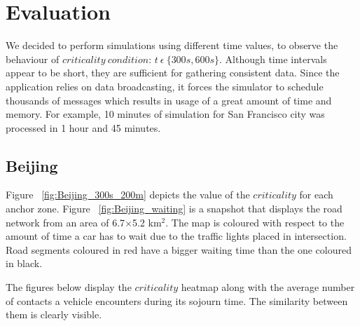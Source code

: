 \section{Evaluation}

We decided to perform simulations using different time values, to observe the
behaviour of $criticality\ condition$: $t\ \epsilon\ \{300s, 600s\}$. Although
time intervals appear to be short, they are sufficient for gathering consistent
data. Since the application relies on data broadcasting, it forces the simulator
to schedule thousands of messages which results in usage of a great amount of
time and memory. For example, 10 minutes of simulation for San Francisco city
was processed in 1 hour and 45 minutes.

\subsection{Beijing}

Figure ~\ref{fig:Beijing_300s_200m} depicts the value of the $criticality$ for each
anchor zone. Figure ~\ref{fig:Beijing_waiting} is a snapshot that displays the
road network from an area of 6.7$\times$5.2 km$^2$. The map is coloured with
respect to the amount of time a car has to wait due to the traffic lights placed
in intersection. Road segments coloured in red have a bigger waiting time than
the one coloured in black.

The figures below display the $criticality$ heatmap along with the average
number of contacts a vehicle encounters during its sojourn time. The similarity
between them is clearly visible.

